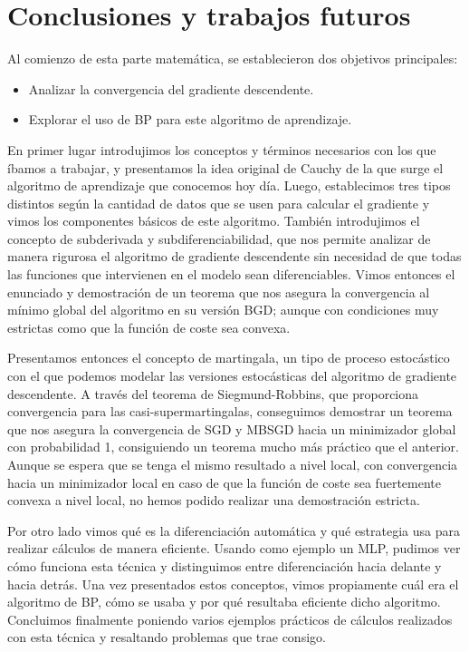 \section{Conclusiones y trabajos futuros}

Al comienzo de esta parte matemática, se establecieron dos objetivos principales:

\begin{itemize}
	\item Analizar la convergencia del gradiente descendente.
	
	\item Explorar el uso de BP para este algoritmo de aprendizaje.
\end{itemize}

En primer lugar introdujimos los conceptos y términos necesarios con los que íbamos a trabajar, y presentamos la idea original de Cauchy de la que surge el algoritmo de aprendizaje que conocemos hoy día. Luego, establecimos tres tipos distintos según la cantidad de datos que se usen para calcular el gradiente y vimos los componentes básicos de este algoritmo. También introdujimos el concepto de subderivada y subdiferenciabilidad, que nos permite analizar de manera rigurosa el algoritmo de gradiente descendente sin necesidad de que todas las funciones que intervienen en el modelo sean diferenciables. Vimos entonces el enunciado y demostración de un teorema que nos asegura la convergencia al mínimo global del algoritmo en su versión BGD; aunque con condiciones muy estrictas como que la función de coste sea convexa.

Presentamos entonces el concepto de martingala, un tipo de proceso estocástico con el que podemos modelar las versiones estocásticas del algoritmo de gradiente descendente. A través del teorema de Siegmund-Robbins, que proporciona convergencia para las casi-supermartingalas, conseguimos demostrar un teorema que nos asegura la convergencia de SGD y MBSGD hacia un minimizador global con probabilidad 1, consiguiendo un teorema mucho más práctico que el anterior. Aunque se espera que se tenga el mismo resultado a nivel local, con convergencia hacia un minimizador local en caso de que la función de coste sea fuertemente convexa a nivel local, no hemos podido realizar una demostración estricta.

Por otro lado vimos qué es la diferenciación automática y qué estrategia usa para realizar cálculos de manera eficiente. Usando como ejemplo un MLP, pudimos ver cómo funciona esta técnica y distinguimos entre diferenciación hacia delante y hacia detrás. Una vez presentados estos conceptos, vimos propiamente cuál era el algoritmo de BP, cómo se usaba y por qué resultaba eficiente dicho algoritmo. Concluimos finalmente poniendo varios ejemplos prácticos de cálculos realizados con esta técnica y resaltando problemas que trae consigo.

